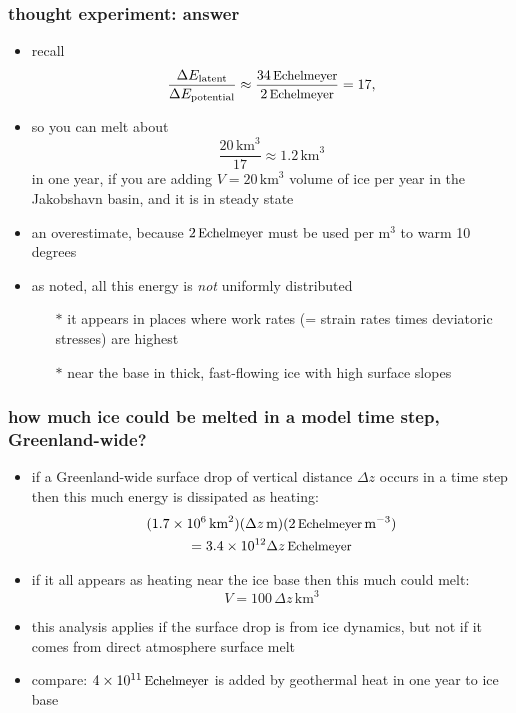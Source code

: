 \documentclass{beamer}
\begin{document}
\begin{frame}
  \frametitle{thought experiment: answer}

\begin{itemize}
\item recall
	$$\frac{\Delta E_{\text{latent}}}{\Delta E_{\text{potential}}} \approx \frac{34\,\text{\small Echelmeyer}}{2\,\text{\small Echelmeyer}} = 17,$$
\item so you can melt about
	$$\frac{20 \,\text{km}^3}{17} \approx 1.2 \,\text{km}^3$$
in one year, if you are adding $V = 20 \,\text{km}^3$ volume of ice per year in the Jakobshavn basin, and it is in steady state
\item an overestimate, because $2\,\text{\small Echelmeyer}$ must be used per $\text{m}^3$ to warm 10 degrees
\item as noted, all this energy is \emph{not} uniformly distributed
  \begin{itemize}
  \item[$\ast$] it appears in places where work rates (= strain rates times deviatoric stresses) are highest
  \item[$\ast$] near the base in thick, fast-flowing ice with high surface slopes
  \end{itemize}
\end{itemize}
\end{frame}


\begin{frame}
  \frametitle{how much ice could be melted in a model time step, Greenland-wide?}
\small

\begin{itemize}
\item if a Greenland-wide surface drop of vertical distance $\Delta z$ occurs in a time step then this much energy is dissipated as heating:
\begin{gather*}
(1.7 \times 10^6\,\text{km}^2) (\Delta z\,\text{m}) (2\,\text{\small Echelmeyer}\,\text{m}^{-3}) \\
  = 3.4 \times 10^{12} \Delta z \,\text{\small Echelmeyer}
\end{gather*}
\item if it all appears as heating near the ice base then this much could melt:
	$$V = 100 \,\Delta z\,\text{km}^3$$
\item this analysis applies if the surface drop is from ice dynamics, but not if it comes from direct atmosphere surface melt
\item compare: $4 \times 10^{11}\,\text{\small Echelmeyer}$ is added by geothermal heat in one year to ice base
\end{itemize}
\end{frame}
\end{document}
